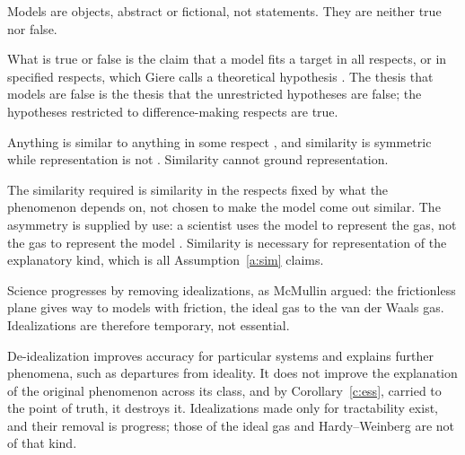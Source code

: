 \documentclass{situationist-preprint}
\begin{document}
\begin{objection}
Models are objects, abstract or fictional, not statements. They are neither true nor false.
\end{objection}

\begin{reply}
What is true or false is the claim that a model fits a target in all respects, or in specified respects, which Giere calls a theoretical hypothesis \citep{Giere1988}. The thesis that models are false is the thesis that the unrestricted hypotheses are false; the hypotheses restricted to difference-making respects are true.
\end{reply}

\begin{objection}
Anything is similar to anything in some respect \citep{Goodman1972}, and similarity is symmetric while representation is not \citep{Suarez2003}. Similarity cannot ground representation.
\end{objection}

\begin{reply}
The similarity required is similarity in the respects fixed by what the phenomenon depends on, not chosen to make the model come out similar. The asymmetry is supplied by use: a scientist uses the model to represent the gas, not the gas to represent the model \citep{Giere2004}. Similarity is necessary for representation of the explanatory kind, which is all Assumption~\ref{a:sim} claims.
\end{reply}

\begin{objection}
Science progresses by removing idealizations, as McMullin argued: the frictionless plane gives way to models with friction, the ideal gas to the van der Waals gas. Idealizations are therefore temporary, not essential.
\end{objection}

\begin{reply}
De-idealization improves accuracy for particular systems and explains further phenomena, such as departures from ideality. It does not improve the explanation of the original phenomenon across its class, and by Corollary~\ref{c:ess}, carried to the point of truth, it destroys it. Idealizations made only for tractability exist, and their removal is progress; those of the ideal gas and Hardy--Weinberg are not of that kind.
\end{reply}
\end{document}
